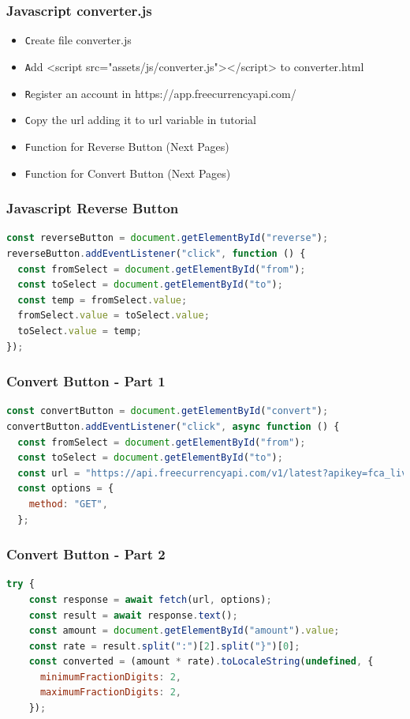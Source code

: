 \documentclass[aspectratio=169, table]{beamer}
\begin{document}
\begin{frame}[fragile]
    \frametitle{Javascript converter.js}
    \begin{itemize}
            \item \texttt Create file converter.js
            \item \texttt Add <script src="assets/js/converter.js"></script> to converter.html
	 \item \texttt Register an account in https://app.freecurrencyapi.com/
	 \item \texttt Copy the url adding it to url variable in tutorial
            \item \texttt Function for Reverse Button (Next Pages)
            \item \texttt Function for Convert Button (Next Pages)
        \end{itemize}
\end{frame}

\begin{frame}[fragile]
    \frametitle{Javascript Reverse Button}
    \begin{lstlisting}[language=JavaScript]
const reverseButton = document.getElementById("reverse");
reverseButton.addEventListener("click", function () {
  const fromSelect = document.getElementById("from");
  const toSelect = document.getElementById("to");
  const temp = fromSelect.value;
  fromSelect.value = toSelect.value;
  toSelect.value = temp;
});
    \end{lstlisting}
\end{frame}

\begin{frame}[fragile]
    \frametitle{Convert Button - Part 1}
    \begin{lstlisting}[language=JavaScript]
const convertButton = document.getElementById("convert");
convertButton.addEventListener("click", async function () {
  const fromSelect = document.getElementById("from");
  const toSelect = document.getElementById("to");
  const url = "https://api.freecurrencyapi.com/v1/latest?apikey=fca_live_iq1WvbaON67X9adHTaJiqEszDhP6jtDz7IouUbWv&currencies=" + toSelect.value + "&base_currency=" + fromSelect.value;
  const options = {
    method: "GET",
  };
    \end{lstlisting}
\end{frame}

\begin{frame}[fragile]
    \frametitle{Convert Button - Part 2}
    \begin{lstlisting}[language=JavaScript]
 try {
    const response = await fetch(url, options);
    const result = await response.text();
    const amount = document.getElementById("amount").value;
    const rate = result.split(":")[2].split("}")[0];
    const converted = (amount * rate).toLocaleString(undefined, {
      minimumFractionDigits: 2,
      maximumFractionDigits: 2,
    });
    \end{lstlisting}
\end{frame}
\end{document}
